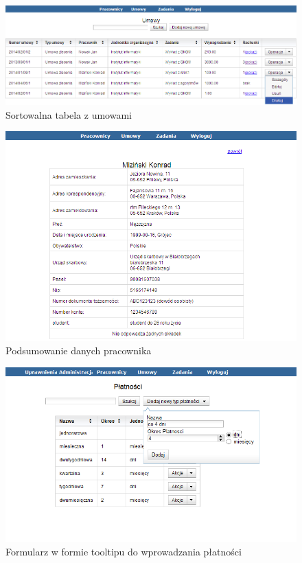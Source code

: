 \begin{figure}[]
    \begin{center}
	\includegraphics[scale=.8,angle=-90]{img/screen3.png}
	\caption{Sortowalna tabela z umowami}
	\label{screen3}
    \end{center}
\end{figure}

\begin{figure}[]
    \begin{center}
	\includegraphics[scale=1,angle=-90]{img/screen4.png}
	\caption{Podsumowanie danych pracownika}
	\label{screen4}
    \end{center}
\end{figure}

\begin{figure}[]
    \begin{center}
	\includegraphics[scale=1,angle=-90]{img/screen5.png}
	\caption{Formularz w formie tooltipu do wprowadzania płatności}
	\label{screen5}
    \end{center}
\end{figure}
